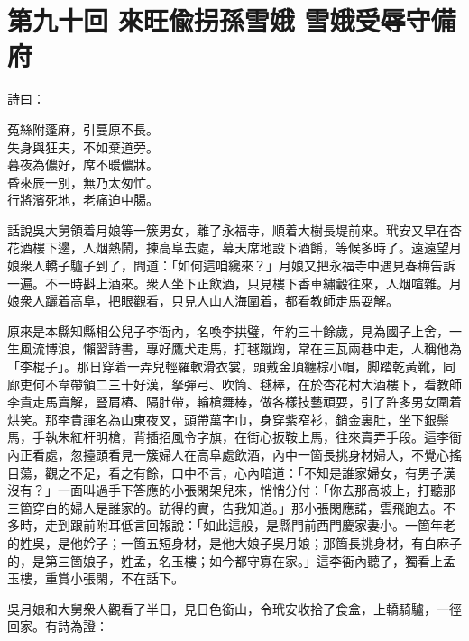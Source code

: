 
\chapter*{第九十回 來旺偸拐孫雪娥 雪娥受辱守備府}


詩曰：

\begin{myquote}
菟絲附蓬麻，引蔓原不長。\\失身與狂夫，不如棄道旁。\\暮夜為儂好，席不暖儂牀。\\昏來辰一別，無乃太匆忙。\\行將濱死地，老痛迫中腸。
\end{myquote}

話說吳大舅領着月娘等一簇男女，離了永福寺，順着大樹長堤前來。玳安又早在杏花酒樓下邊，人烟熱鬧，揀高阜去處，幕天席地設下酒餚，等候多時了。遠遠望月娘衆人轎子驢子到了，問道：「如何這咱纔來？」月娘又把永福寺中遇見春梅告訴一遍。不一時斟上酒來。衆人坐下正飲酒，只見樓下香車繡轂往來，人烟喧雜。月娘衆人躧着高阜，把眼觀看，只見人山人海圍着，都看教師走馬耍解。

原來是本縣知縣相公兒子李衙內，名喚李拱璧，年約三十餘歲，見為國子上舍，一生風流博浪，懶習詩書，專好鷹犬走馬，打毬蹴踘，常在三瓦兩巷中走，人稱他為「李棍子」。那日穿着一弄兒輕羅軟滑衣裳，頭戴金頂纏棕小帽，脚踏乾黃靴，同廊吏何不韋帶領二三十好漢，拏彈弓、吹筒、毬棒，在於杏花村大酒樓下，看教師李貴走馬賣解，豎肩樁、隔肚帶，輪槍舞棒，做各樣技藝頑耍，引了許多男女圍着烘笑。那李貴諢名為山東夜叉，頭帶萬字巾，身穿紫窄衫，銷金裏肚，坐下銀鬃馬，手執朱紅杆明槍，背插招風令字旗，在街心扳鞍上馬，往來賣弄手段。這李衙內正看處，忽擡頭看見一簇婦人在高阜處飲酒，內中一箇長挑身材婦人，不覺心搖目蕩，觀之不足，看之有餘，口中不言，心內暗道：「不知是誰家婦女，有男子漢沒有？」{}一面叫過手下答應的小張閑架兒來，悄悄分付：「你去那高坡上，打聽那三箇穿白的婦人是誰家的。訪得的實，告我知道。」那小張閑應諾，雲飛跑去。不多時，走到跟前附耳低言回報說：「如此這般，是縣門前西門慶家妻小。一箇年老的姓吳，是他妗子；一箇五短身材，是他大娘子吳月娘；那箇長挑身材，有白麻子的，是第三箇娘子，姓孟，名玉樓；如今都守寡在家。」這李衙內聽了，獨看上孟玉樓，重賞小張閑，不在話下。

吳月娘和大舅衆人觀看了半日，見日色銜山，令玳安收拾了食盒，上轎騎驢，一徑回家。有詩為證：

